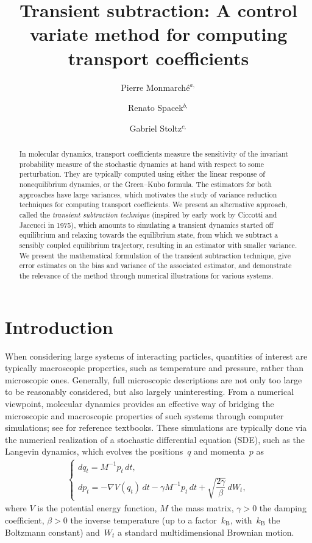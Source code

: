 \documentclass[11pt]{article}
\title{Transient subtraction: A control variate method for computing transport coefficients}
\author[1]{Pierre Monmarch\'e$^{a,}$}
\author[2,3]{Renato Spacek$^{b,}$}
\author[3,2]{Gabriel Stoltz$^{c,}$}
\affil[ ]{\footnotesize $^a$\email{pierre.monmarche@sorbonne-universite.fr},
                        $^b$\email{renato.spacek@enpc.fr},
                        $^c$\email{gabriel.stoltz@enpc.fr}}
\affil[1]{\footnotesize LJLL and LCT, Sorbonne Universit\'e, Paris, France}
\affil[2]{\footnotesize MATHERIALS team, Inria Paris, France}
\affil[3]{\footnotesize CERMICS, \'Ecole des Ponts, France}
\theoremstyle{definition}
\begin{document}
\maketitle

\begin{abstract}
In molecular dynamics, transport coefficients measure the sensitivity of the invariant probability measure of the stochastic dynamics at hand with respect to some perturbation. They are typically computed using either the linear response of nonequilibrium dynamics, or the Green--Kubo formula. The estimators for both approaches have large variances, which motivates the study of variance reduction techniques for computing transport coefficients. We present an alternative approach, called the \emph{transient subtraction technique} (inspired by early work by Ciccotti and Jaccucci in 1975), which amounts to simulating a transient dynamics started off equilibrium and relaxing towards the equilibrium state, from which we subtract a sensibly coupled equilibrium trajectory, resulting in an estimator with smaller variance. We present the mathematical formulation of the transient subtraction technique, give error estimates on the bias and variance of the associated estimator, and demonstrate the relevance of the method through numerical illustrations for various systems.
\end{abstract}

\section{Introduction}
\label{sec:introduction}
When considering large systems of interacting particles, quantities of interest are typically macroscopic properties, such as temperature and pressure, rather than microscopic ones. Generally, full microscopic descriptions are not only too large to be reasonably considered, but also largely uninteresting. From a numerical viewpoint, molecular dynamics provides an effective way of bridging the microscopic and macroscopic properties of such systems through computer simulations; see \cite{tuckerman2010, leimkuhler2015,allen2017} for reference textbooks. These simulations are typically done via the numerical realization of a stochastic differential equation (SDE), such as the Langevin dynamics, which evolves the positions~$q$ and momenta~$p$ as
\begin{equation}
\begin{aligned}
\begin{cases}
    dq_t = M^{-1} p_t \, dt, \\
    dp_t = -\nabla V(q_t) \, dt - \gamma M^{-1} p_t \, dt + \sqrt{\dfrac{2\gamma}{\beta}} \, dW_t,
    \label{eq:lang_dynamics}
\end{cases}
\end{aligned}
\end{equation}
where $V$ is the potential energy function, $M$ the mass matrix, $\gamma>0$ the damping coefficient, $\beta>0$ the inverse temperature (up to a factor~$k_\mathrm{B}$, with~$k_\mathrm{B}$ the Boltzmann constant) and~$W_t$ a standard multidimensional Brownian motion.
\end{document}
